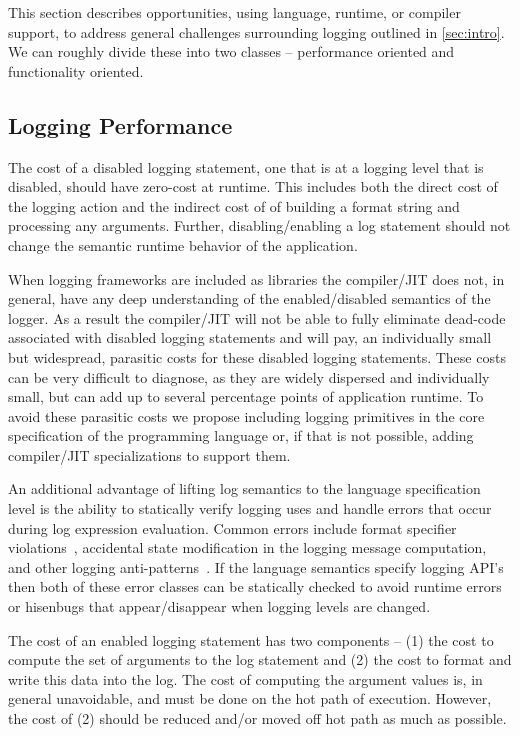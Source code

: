 This section describes opportunities, using language, runtime, or compiler support, to address 
general challenges surrounding logging outlined in \autoref{sec:intro}. We can roughly divide 
these into two classes -- performance oriented and functionality oriented. 

\subsection{Logging Performance}
\label{subsec:performancedesign}

\begin{design}
The cost of a disabled logging statement, one that is at a logging level that 
is disabled, should have zero-cost at runtime. This includes both the direct 
cost of the logging action and the indirect cost of of building a format 
string and processing any arguments. Further, disabling/enabling a log 
statement should not change the semantic runtime behavior of the application.
\end{design}

When logging frameworks are included as libraries the compiler/JIT does not, 
in general, have any deep understanding of the enabled/disabled semantics of 
the logger. As a result the compiler/JIT will not be able to fully eliminate 
dead-code associated with disabled logging statements and will pay, an individually 
small but widespread, parasitic costs for these disabled logging statements. 
These costs can be very difficult to diagnose, as they are widely dispersed and 
individually small, but can add up to several percentage points of application 
runtime. To avoid these parasitic costs we propose including logging primitives 
in the core specification of the programming language or, if that is not possible, 
adding compiler/JIT specializations to support them. 

An additional advantage of lifting log semantics to the language specification 
level is the ability to statically verify logging uses and handle errors that 
occur during log expression evaluation. Common errors include 
format specifier violations~\cite{tyepcheckprintf}, accidental state 
modification in the logging message computation, and other logging anti-patterns~\cite{logginganti}. 
If the language semantics 
specify logging API's then both of these error classes can be statically 
checked to avoid runtime errors or hisenbugs that appear/disappear when logging 
levels are changed.

\begin{design}
The cost of an enabled logging statement has two components -- (1) the cost to 
compute the set of arguments to the log statement and (2) the cost to format and 
write this data into the log. The cost of computing the argument values is, in 
general unavoidable, and must be done on the hot path of execution. However, 
the cost of (2) should be reduced and/or moved off hot path as much as possible.
\end{design}

